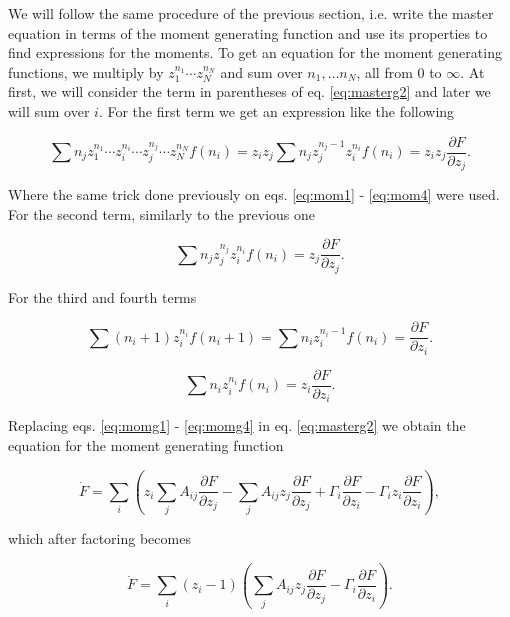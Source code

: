 We will follow the same procedure of the previous section, i.e. write the master equation in terms of the moment generating function and use its properties to find expressions for the moments. To get an equation for the moment generating functions, we multiply by $z_1^{n_1}\dotsm z_N^{n_N}$ and sum over $n_1,\dotsc n_N$, all from $0$ to $\infty$. At first, we will consider the term in parentheses of eq. \ref{eq:masterg2} and later we will sum over $i$. For the first term we get an expression like the following

\begin{equation}
\label{eq:momg1}
\sum n_j z_1^{n_1}\dotsm z_i^{n_i}\dotsm z_j^{n_j}\dotsm z_N^{n_N} f(n_i) = z_iz_j\sum n_jz_j^{n_j-1}z_i^{n_i}f(n_i) = z_iz_j\frac{\partial F}{\partial z_j}. 
\end{equation} 

Where the same trick done previously on eqs. \ref{eq:mom1} - \ref{eq:mom4} were used. For the second term, similarly to the previous one

\begin{equation}
\label{eq:momg2}
\sum n_jz_j^{n_j}z_i^{n_i}f(n_i) = z_j\frac{\partial F}{\partial z_j}.
\end{equation}

For the third and fourth terms

\begin{equation}
\label{eq:momg3}
\sum (n_i+1)z_i^{n_i}f(n_i+1) = \sum n_i z_i^{n_i-1}f(n_i) = \frac{\partial F}{\partial z_i}.
\end{equation}

\begin{equation}
\label{eq:momg4}
\sum n_iz_i^{n_i}f(n_i) = z_i\frac{\partial F}{\partial z_i}.
\end{equation}

Replacing eqs. \ref{eq:momg1} - \ref{eq:momg4} in eq. \ref{eq:masterg2} we obtain the equation for the moment generating function

\begin{equation}
\dot{F} = \sum_i\left( z_i\sum_jA_{ij}\frac{\partial F}{\partial z_j} - \sum_jA_{ij} z_j \frac{\partial F}{\partial z_j} + \Gamma_i\frac{\partial F}{\partial z_i} - \Gamma_iz_i\frac{\partial F}{\partial z_i}\right),
\end{equation}

which after factoring becomes

\begin{equation}
\label{eq:momg}
\dot{F} = \sum_i (z_i-1)\left(\sum_jA_{ij} z_j \frac{\partial F}{\partial z_j} - \Gamma_i\frac{\partial F}{\partial z_i}\right).
\end{equation}

